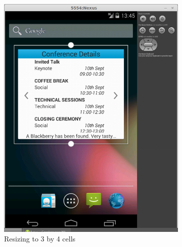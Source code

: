 \documentclass[11pt, a4paper]{article}
\begin{document}
\begin{figure}[h]
\centering
\begin{subfigure}[b]{0.3\textwidth}
\includegraphics[width=\textwidth]{img/resizing-3x4}
\caption{Resizing to 3 by 4 cells}
\end{subfigure}
\begin{subfigure}[b]{0.3\textwidth}

\end{subfigure}
\end{figure}
\end{document}
